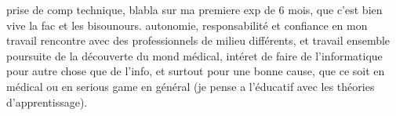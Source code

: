 prise de comp technique, blabla sur ma premiere exp de 6 mois, que c'est bien vive la fac et les bisounours.
autonomie, responsabilité et confiance en mon travail
rencontre avec des professionnels de milieu différents, et travail ensemble
poursuite de la découverte du mond médical, intéret de faire de l'informatique pour autre chose que de l'info, et surtout pour une bonne cause, que ce soit en médical ou en serious game en général (je pense a l'éducatif avec les théories d'apprentissage).